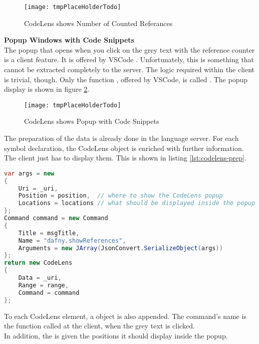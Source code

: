\begin{figure}[H]
    \centering
    \texttt{[image: tmpPlaceHolderTodo]}
    \caption{CodeLens shows Number of Counted Referances}
    \label{fig:codelens_show_ref_number}
\end{figure}

\textbf{Popup Windows with Code Snippets} \\
The popup that opens when you click on the grey text
with the reference counter is a client feature.
It is offered by VSCode \cite{vscodeAPI}.
Unfortunately, this is something that cannot be extracted completely to the server.
The logic required within the client is trivial, though.
Only the function ,
offered by VSCode, is called \cite{vscodeAPI}.
The popup display is shown in figure \ref{fig:codelens_show_popup}. \\

\begin{figure}[H]
    \centering
    \texttt{[image: tmpPlaceHolderTodo]}
    \caption{CodeLens shows Popup with Code Snippets}
    \label{fig:codelens_show_popup}
\end{figure}

The preparation of the data is already done in the language server.
For each symbol declaration, the CodeLens object is enriched with further information.
The client just has to display them.
This is shown in listing \ref{lst:codelens-prep}.

\begin{lstlisting}[language=csharp, caption={LSP Handler Implementation}, captionpos=b, label={lst:codelens-prep}]
var args = new
{
    Uri = _uri,
    Position = position,  // where to show the CodeLens popup
    Locations = locations // what should be displayed inside the popup
};
Command command = new Command
{
    Title = msgTitle,
    Name = "dafny.showReferences",
    Arguments = new JArray(JsonConvert.SerializeObject(args))
};
return new CodeLens
{
    Data = _uri,
    Range = range,
    Command = command
};
\end{lstlisting}

To each CodeLens element, a  object is also appended.
The command's name is the function called at the client, when the grey text is clicked.\\

In addition, the  is given the positions it should display inside the popup.  \\

